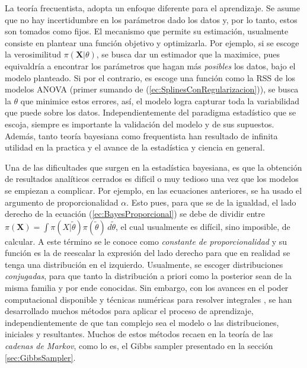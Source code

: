 \documentclass[../Main/Main.tex]{subfiles}
\begin{document}
La teoría frecuentista, adopta un enfoque diferente para el  aprendizaje. Se asume que no hay incertidumbre en los parámetros dado los datos y, por lo tanto, estos son tomados como fijos. El mecanismo que permite su estimación, usualmente consiste en plantear una función objetivo y optimizarla. Por ejemplo, si se escoge la verosimilitud $\pi(\mathbf{X}|\theta)$, se busca dar un estimador que la maximice, pues equivaldría a encontrar los parámetros que hagan más \textit{posibles} los datos, bajo el modelo planteado. Si por el contrario, es escoge una función como la RSS de los modelos ANOVA (primer sumando de (\ref{ec:SplinesConRegularizacion})), se busca la $\theta$ que minimice estos errores, así, el modelo logra capturar toda la variabilidad que puede sobre los datos. Independientemente del paradigma estadístico que se escoja, siempre es importante la validación del modelo y de sus supuestos. Además, tanto teoría bayesiana como frequentista han resultado de infinita utilidad en la practica y el avance de la estadística y ciencia en general.

Una de las dificultades que surgen en la estadística bayesiana, es que la obtención de resultados analíticos cerrados es difícil o muy tedioso una vez que los modelos se empiezan a complicar. Por ejemplo, en las ecuaciones anteriores, se ha usado el argumento de proporcionalidad $\alpha$. Esto pues, para que se de la igualdad, el lado derecho de la ecuación (\ref{ec:BayesProporcional}) se debe de dividir entre $\pi(\mathbf{X}) = \int \pi(X|\tilde{\theta})\pi(\tilde{\theta})\,d\tilde{\theta}$, el cual usualmente es difícil, sino imposible, de calcular. A este término se le conoce como \textit{constante de proporcionalidad} y su función es la de reescalar la expresión del lado derecho para que en realidad se tenga una distribución en el izquierdo. Usualmente, se escoger distribuciones \textit{conjugadas}, para que tanto la distribución a priori como la posterior sean de la misma familia y por ende conocidas. Sin embargo, con los avances en el poder computacional disponible y técnicas numéricas para resolver integrales \autocite{robert2004monte}, se han desarrollado muchos métodos para aplicar el proceso de aprendizaje, independientemente de que tan complejo sea el modelo o las distribuciones, iniciales y resultantes. Muchos de estos métodos recaen en la teoría de las \textit{cadenas de Markov}, como lo es, el Gibbs sampler presentado en la sección \ref{sec:GibbsSampler}. 
\end{document}
